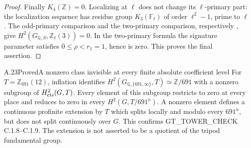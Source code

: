 \begin{proof}
Finally $K_4(\mathbb Z)=0$. Localizing at $\ell$ does not change
its $\ell$-primary part: the localization sequence has residue group
$K_3(\mathbb F_\ell)$ of order $\ell^2-1$, prime to $\ell$
\cite[IV.1.13; V.6.8]{CohWeibelKbook}. The odd-primary comparison and the
two-primary comparison, respectively
\cite[VI.8.2; VI.9.11, case $n=4$; Table VI.10.1.1]{CohWeibelKbook},
give $H^2(G_{\mathbb Q,S},\mathbb Z_\ell(3))=0$.
In the two-primary formula the signature parameter satisfies
$0\leq\rho<r_1=1$, hence is zero. This proves the final assertion.
\end{proof}

\begin{result}{A.23}{Proved}{A nonzero class invisible at every finite absolute coefficient level}
\label{coh:691}
For $T=\mathbb Z_{691}(12)$, inflation identifies
$H^2(G_{\mathbb Q,\{691,\infty\}},T)\simeq\mathbb Z/691$
with a nonzero subgroup of $H^2_{\rm cts}(G,T)$. Every element of
this subgroup restricts to zero at every place and reduces to zero in
every $H^2(G,T/691^n)$. A nonzero element defines a continuous
profinite extension by $T$ which splits locally and modulo every
$691^n$, but does not split continuously over $G$.
This confirms GT\_TOWER\_CHECK C.1.8--C.1.9. The extension is not
asserted to be a quotient of the tripod fundamental group.
\end{result}
